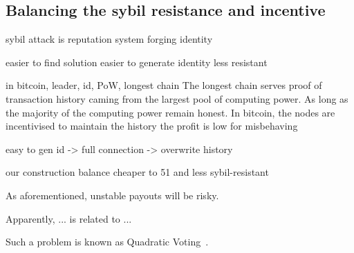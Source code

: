 \subsection{Balancing the sybil resistance and incentive}



sybil attack is 
reputation system
forging identity

easier to find solution
easier to generate identity
less resistant

in bitcoin, leader, id, PoW, longest chain
The longest chain serves proof of transaction history caming from the largest pool of computing power.
As long as the majority of the computing power remain honest.
In bitcoin, the nodes are incentivised to maintain the history
the profit is low for misbehaving

easy to gen id -> full connection -> overwrite history


our construction
balance
cheaper to 51 and less sybil-resistant


As aforementioned, unstable payouts will be risky.


Apparently, 
... is related to ...

Such a problem is known as Quadratic Voting~\cite{lalley2018quadratic}.
